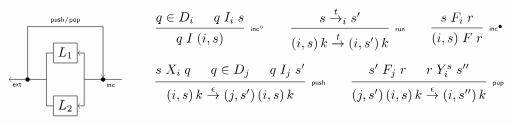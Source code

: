 \documentclass[11pt,oneside,draft]{book}
\theoremstyle{definition}
\newcommand{\kw}[1]{\ensuremath{ \mathsf{#1} }}
\newcommand{\que}{\circ}         %
\newcommand{\ans}{\bullet}       %
\begin{document}
\begin{figure} %
  \[
  \begin{tikzpicture}[xscale=0.5,yscale=0.7,
      baseline=(current bounding box.center)]
    \node[draw] (L1) at (0, 1) {$L_1$};
    \node[draw] (L2) at (0,-1) {$L_2$};
    \begin{scope}[circle, minimum size=3, inner sep=0]
      \node[draw, fill=black] (X) at (-2,0) {};
      \node[draw, fill=black] (I) at (+2,0) {};
    \end{scope}
    \tiny
    \node[below right] at (I) {$\kw{inc}$};
    \draw (L1) -| (-1,0);
    \draw (L2) -| (-1,0) -- (X);
    \draw[->] (X) -- node[below] {$\kw{ext}$} (-3,0);
    \draw[->] (X) |- (0,2) node[above] {$\kw{push}/\kw{pop}$} -| (I);
    \draw (3,0) -- (1,0);
    \draw[->] (1,0) |- (L1);
    \draw[->] (1,0) |- (L2);
  \end{tikzpicture}
  \qquad
    \begin{array}{c}
     {\begin{prooftree}
        \hypo{q \in D_i}
        \hypo{q \mathrel{I_i} s}
        \infer2[\tiny $\kw{inc}^\que$]{q \mathrel{I} (i, s)}
      \end{prooftree}}
      \qquad
     {\begin{prooftree}
        \hypo{s \stackrel{t}{\rightarrow}_i s'}
        \infer1[\tiny $\kw{run}$]{
            (i, s) \, k
            \stackrel{t}{\rightarrow}
            (i, s') \, k}
      \end{prooftree}}
      \qquad
     {\begin{prooftree}
        \hypo{s \mathrel{F_i} r}
        \infer1[\tiny $\kw{inc}^\ans$]{(i, s) \mathrel{F} r}
      \end{prooftree}}
      \vspace{1em}
      \\
     {\begin{prooftree}
        \hypo{s \mathrel{X_i} q}
        \hypo{q \in D_j}
        \hypo{q \mathrel{I_j} s'}
        \infer3[\tiny $\kw{push}$]{
            (i, s) \, k
            \stackrel{\epsilon}{\rightarrow}
            (j, s') \, (i, s) \, k}
      \end{prooftree}}
      \qquad
     {\begin{prooftree}
        \hypo{s' \mathrel{F_j} r}
        \hypo{r \mathrel{Y_i^s} s''}
        \infer2[\tiny $\kw{pop}$]{
            (j, s') \, (i, s) \, k
            \stackrel{\epsilon}{\rightarrow}
            (i, s'') \, k}
      \end{prooftree}}
      \vspace{1em}

\end{array}\]
\end{figure}
\end{document}
